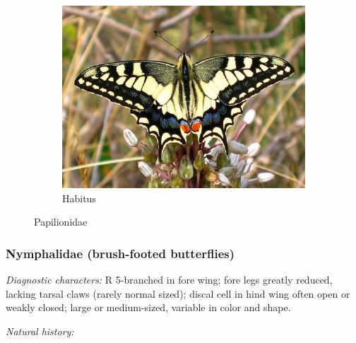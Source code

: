 \documentclass[letterpaper, 11pt]{article}
\begin{document}
\begin{figure}[ht!]
\begin{subfigure}[ht!]{0.5\textwidth}
        \includegraphics[width=\textwidth]{image27}
        \caption{Habitus}
        \label{fig:papilionid2}
    \end{subfigure}
    \caption{Papilionidae}\label{fig:papilionids}
\end{figure}

\subsubsection{Nymphalidae (brush-footed butterflies)}
\noindent{}\textit{Diagnostic characters:} R 5-branched in fore wing; fore legs greatly reduced, lacking tarsal claws (rarely normal sized); discal cell in hind wing often open or weakly closed; large or medium-sized, variable in color and shape.

\noindent{}\textit{Natural history:} 
\end{document}

